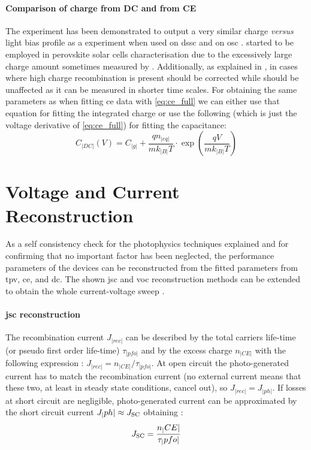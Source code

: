 	\paragraph{Comparison of charge from DC and from CE}
	The  experiment has been demonstrated to output a very similar charge \textsl{versus} light bias profile as a  experiment when used on \gls{dssc} \cite{ORegan2005,Barnes2013} and on \gls{osc} \cite{Shuttle2008a}.
	 started to be employed in perovskite solar cells characterisation due to the excessively large charge amount sometimes measured by  \cite{Wheeler2017,ORegan2015b}.
	Additionally, as explained in , in cases where high charge recombination is present  should be corrected while  should be unaffected as it can be measured in shorter time scales.
	For obtaining the same parameters as when fitting \gls{ce} data with \cref{eq:ce_full} we can either use that equation for fitting the integrated charge or use the following (which is just the voltage derivative of \cref{eq:ce_full}) for fitting the capacitance:
	\begin{equation}\label{eq:dc_full}
		C_|DC|(V) = C_|g| + \frac{qn_|eq|}{mk_|B|T} \cdot \exp(\frac{qV}{mk_|B|T})
	\end{equation}

	\FloatBarrier
	\newpage
\section{Voltage and Current Reconstruction}
	As a self consistency check for the photophysics techniques explained and for confirming that no important factor has been neglected, the performance parameters of the devices can be reconstructed from the fitted parameters from \gls{tpv}, \gls{ce}, and \gls{dc}.
	The shown \gls{jsc} and \gls{voc} reconstruction methods can be extended to obtain the whole current-voltage sweep \cite{Maurano2011}.

	\paragraph{\Gls{jsc} reconstruction}\label{jsc_reconstruction}
	The recombination current $J_|rec|$ can be described by the total carriers life\hyp{}time (or pseudo first order life\hyp{}time) $\tau_|pfo|$ and by the excess charge $n_|CE|$ with the following expression \cite{Wheeler2017,Du2018}: $J_|rec| = n_|CE| / \tau_|pfo|$.
	At open circuit the photo\hyp{}generated current has to match the recombination current (no external current means that these two, at least in steady state conditions, cancel out), so $J_|rec| = J_|ph|$.
	If losses at short circuit are negligible, photo\hyp{}generated current can be approximated by the short circuit current $J_|ph| \approx J_\mathrm{SC}$ obtaining \cite{ORegan2015b}:
	\begin{equation}\label{eq:reconstruction_jsc}
		J_\mathrm{SC} = \frac{n_|CE|}{\tau_|pfo|}
	\end{equation}

